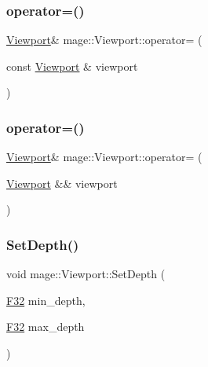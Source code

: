 \hypertarget{structmage_1_1_viewport_ab06320c545dd9b71d17e7f8c92fb693c}{}\label{structmage_1_1_viewport_ab06320c545dd9b71d17e7f8c92fb693c} 
\subsubsection{\texorpdfstring{operator=()}{operator=()}\hspace{0.1cm}{\footnotesize\ttfamily [1/2]}}
{\footnotesize\ttfamily \hyperlink{structmage_1_1_viewport}{Viewport}\& mage\+::\+Viewport\+::operator= (\begin{DoxyParamCaption}\item[{const \hyperlink{structmage_1_1_viewport}{Viewport} \&}]{viewport }\end{DoxyParamCaption})\hspace{0.3cm}{\ttfamily [default]}}

\hypertarget{structmage_1_1_viewport_a83ef22f5db0991bc540372d37905524d}{}\label{structmage_1_1_viewport_a83ef22f5db0991bc540372d37905524d} 
\subsubsection{\texorpdfstring{operator=()}{operator=()}\hspace{0.1cm}{\footnotesize\ttfamily [2/2]}}
{\footnotesize\ttfamily \hyperlink{structmage_1_1_viewport}{Viewport}\& mage\+::\+Viewport\+::operator= (\begin{DoxyParamCaption}\item[{\hyperlink{structmage_1_1_viewport}{Viewport} \&\&}]{viewport }\end{DoxyParamCaption})\hspace{0.3cm}{\ttfamily [default]}}

\hypertarget{structmage_1_1_viewport_a15a328f7feb3f17dc1c9af47f30dce3b}{}\label{structmage_1_1_viewport_a15a328f7feb3f17dc1c9af47f30dce3b} 
\subsubsection{\texorpdfstring{Set\+Depth()}{SetDepth()}}
{\footnotesize\ttfamily void mage\+::\+Viewport\+::\+Set\+Depth (\begin{DoxyParamCaption}\item[{\hyperlink{namespacemage_aa97e833b45f06d60a0a9c4fc22ae02c0}{F32}}]{min\+\_\+depth,  }\item[{\hyperlink{namespacemage_aa97e833b45f06d60a0a9c4fc22ae02c0}{F32}}]{max\+\_\+depth }\end{DoxyParamCaption})\hspace{0.3cm}{\ttfamily [noexcept]}}

